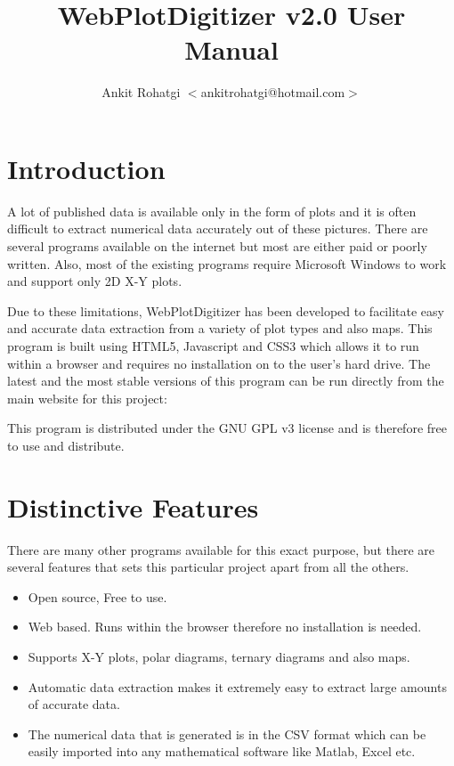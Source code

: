 \documentclass[letterpaper, 11pt]{article}
\title{WebPlotDigitizer v2.0 User Manual}
\author{Ankit Rohatgi $<$ankitrohatgi@hotmail.com$>$}
\begin{document}
\maketitle
\tableofcontents
\newpage

\section{Introduction}

A lot of published data is available only in the form of plots and it is often difficult to extract numerical data accurately out of these pictures. There are several programs available on the internet but most are either paid or poorly written. Also, most of the existing programs require Microsoft Windows to work and support only 2D X-Y plots.

Due to these limitations, WebPlotDigitizer has been developed to facilitate easy and accurate data extraction from a variety of plot types and also maps. This program is built using HTML5, Javascript and CSS3 which allows it to run within a browser and requires no installation on to the user’s hard drive. The latest and the most stable versions of this program can be run directly from the main website for this project: 

\hspace{1.5in}{http://arohatgi.info/WebPlotDigitizer}

This program is distributed under the GNU GPL v3 license and is therefore free to use and distribute.

\section{Distinctive Features}

There are many other programs available for this exact purpose, but there are several features that sets this particular project apart from all the others.

\begin{itemize}
\item{Open source, Free to use.}
\item{Web based. Runs within the browser therefore no installation is needed.}
\item{Supports X-Y plots, polar diagrams, ternary diagrams and also maps.}
\item{Automatic data extraction makes it extremely easy to extract large amounts of accurate data.}
\item{The numerical data that is generated is in the CSV format which can be easily imported into any mathematical software like Matlab, Excel etc.}
\end{itemize}
\end{document}
